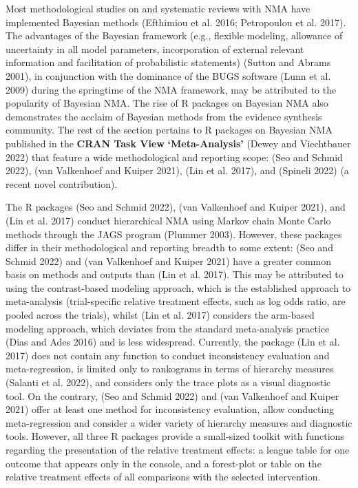 Most methodological studies on and systematic reviews with NMA have implemented
Bayesian methods (Efthimiou et al. 2016; Petropoulou et al. 2017). The advantages of the Bayesian
framework (e.g., flexible modeling, allowance of uncertainty in all model parameters,
incorporation of external relevant information and facilitation of probabilistic
statements) (Sutton and Abrams 2001), in conjunction with the dominance of the BUGS software
(Lunn et al. 2009) during the springtime of the NMA framework, may be attributed to the
popularity of Bayesian NMA. The rise of R packages on Bayesian NMA also demonstrates
the acclaim of Bayesian methods from the evidence synthesis community. The rest of
the section pertains to R packages on Bayesian NMA published in the \textbf{CRAN Task View}
\textbf{`Meta-Analysis'} (Dewey and Viechtbauer 2022) that feature a wide methodological and reporting
scope:  (Seo and Schmid 2022),  (van Valkenhoef and Kuiper 2021), 
(Lin et al. 2017), and  (Spineli 2022) (a recent novel contribution).

The R packages  (Seo and Schmid 2022),  (van Valkenhoef and Kuiper 2021), and 
(Lin et al. 2017) conduct hierarchical NMA using Markov chain Monte Carlo methods
through the JAGS program (Plummer 2003). However, these packages differ in their
methodological and reporting breadth to some extent:  (Seo and Schmid 2022) and
 (van Valkenhoef and Kuiper 2021) have a greater common basis on methods and outputs than
 (Lin et al. 2017). This may be attributed to using the contrast-based
modeling approach, which is the established approach to meta-analysis (trial-specific
relative treatment effects, such as log odds ratio, are pooled across the trials),
whilst  (Lin et al. 2017) considers the arm-based modeling approach,
which deviates from the standard meta-analysis practice (Dias and Ades 2016) and is less
widespread. Currently, the package  (Lin et al. 2017) does not contain
any function to conduct inconsistency evaluation and meta-regression, is limited
only to rankograms in terms of hierarchy measures (Salanti et al. 2022), and considers only
the trace plots as a visual diagnostic tool. On the contrary,  (Seo and Schmid 2022)
and  (van Valkenhoef and Kuiper 2021) offer at least one method for inconsistency evaluation,
allow conducting meta-regression and consider a wider variety of hierarchy measures
and diagnostic tools. However, all three R packages provide a small-sized toolkit
with functions regarding the presentation of the relative treatment effects: a league
table for one outcome that appears only in the console, and a forest-plot or table
on the relative treatment effects of all comparisons with the selected intervention.

